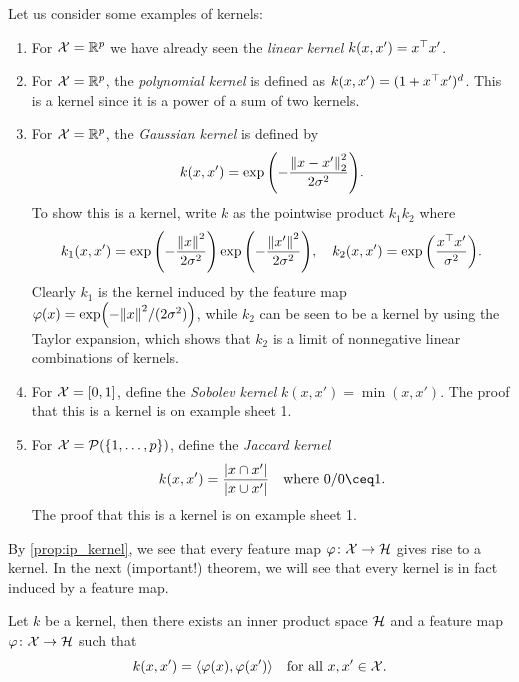 \begin{example} Let us consider some examples of kernels:
    \begin{enumerate}
        \item For $\mathcal X = \mathbb R^p$ we have already seen the \emph{linear kernel} $k(x, x') = x^\top x'$. 
        \item For $\mathcal X = \mathbb R^p$, the \emph{polynomial kernel} is defined as $k(x, x') = (1 + x^\top x')^d$. This is a kernel since it is a power of a sum of two kernels. 
        \item For $\mathcal X = \mathbb R^p$, the \emph{Gaussian kernel} is defined by
        \[
        k(x, x') = \exp\qty( - \frac{\norm{x - x'}_2^2}{2\sigma^2}).
        \]
        To show this is a kernel, write $k$ as the pointwise product $k_1k_2$ where
        \[
        k_1(x, x') = \exp\qty(-\frac{\norm{x}^2}{2\sigma^2}) \exp\qty(-\frac{\norm{x'}^2}{2\sigma^2}), \quad k_2(x, x') = \exp\qty(\frac{x^\top x'}{\sigma^2}). 
        \]
        Clearly $k_1$ is the kernel induced by the feature map $\varphi(x) = \exp(-\norm{x}^2/(2\sigma^2))$, while $k_2$ can be seen to be a kernel by using the Taylor expansion, which shows that $k_2$ is a limit of nonnegative linear combinations of kernels. 
        
        \item For $\mathcal X = [0, 1]$, define the \emph{Sobolev kernel} $k(x, x') = \min(x, x')$. The proof that this is a kernel is on example sheet 1. 
        \item For $\mathcal X = \mathcal P(\qty{1, \dotsc, p})$, define the \emph{Jaccard kernel}
        \[
        k(x, x') = \frac{\abs{x \cap x'}}{\abs{x \cup x'}} \quad\text{where $0/0 \ceq 1$}. 
        \]
        The proof that this is a kernel is on example sheet 1. 
    \end{enumerate}
\end{example}

By \cref{prop:ip_kernel}, we see that every feature map $\varphi \colon \mathcal X \to \mathcal H$ gives rise to a kernel. In the next (important!) theorem, we will see that every kernel is in fact induced by a feature map.

\begin{theorem} \label{thm:kernel_ip}
    Let $k$ be a kernel, then there exists an inner product space $\mathcal H$ and a feature map $\varphi \colon \mathcal X \to \mathcal H$ such that 
    \[
    k(x, x') = \langle\varphi(x), \varphi(x')\rangle \quad\text{for all $x, x' \in \mathcal X$}. 
    \]
\end{theorem}

